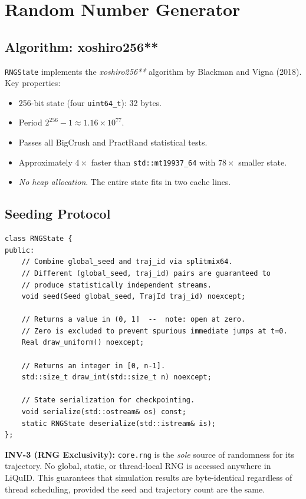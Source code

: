 \documentclass[11pt,a4paper,twoside]{book}
\newcommand{\code}[1]{\texttt{\small#1}}
\theoremstyle{definition}
\theoremstyle{remark}
\begin{document}
\section{Random Number Generator}
\label{sec:rng}

\subsection{Algorithm: xoshiro256**}
\label{subsec:xoshiro}

\code{RNGState} implements the \emph{xoshiro256**} algorithm by
Blackman and Vigna (2018). Key properties:

\begin{itemize}
  \item 256-bit state (four \code{uint64\_t}): 32 bytes.
  \item Period $2^{256} - 1 \approx 1.16 \times 10^{77}$.
  \item Passes all BigCrush and PractRand statistical tests.
  \item Approximately $4\times$ faster than \code{std::mt19937\_64}
        with $78\times$ smaller state.
  \item \emph{No heap allocation}. The entire state fits in two
        cache lines.
\end{itemize}

\subsection{Seeding Protocol}
\label{subsec:seeding}

\begin{verbatim}
class RNGState {
public:
    // Combine global_seed and traj_id via splitmix64.
    // Different (global_seed, traj_id) pairs are guaranteed to
    // produce statistically independent streams.
    void seed(Seed global_seed, TrajId traj_id) noexcept;

    // Returns a value in (0, 1]  --  note: open at zero.
    // Zero is excluded to prevent spurious immediate jumps at t=0.
    Real draw_uniform() noexcept;

    // Returns an integer in [0, n-1].
    std::size_t draw_int(std::size_t n) noexcept;

    // State serialization for checkpointing.
    void serialize(std::ostream& os) const;
    static RNGState deserialize(std::istream& is);
};
\end{verbatim}

\begin{invbox}
  \textbf{INV-3 (RNG Exclusivity):} \code{core.rng} is the \emph{sole}
  source of randomness for its trajectory. No global, static, or
  thread-local RNG is accessed anywhere in LiQuID. This guarantees
  that simulation results are byte-identical regardless of thread
  scheduling, provided the seed and trajectory count are the same.
\end{invbox}
\end{document}
